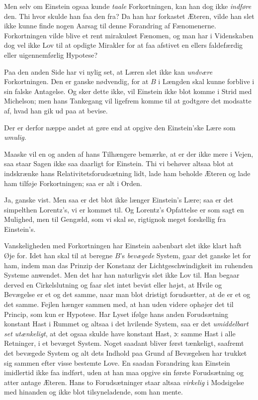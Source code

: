\documentclass[12pt,a4paper]{article}
\newcommand{\opage}[1]{\marginnote{\footnotesize\textit{[#1]}}}
\begin{document}
Men selv om Einstein ogsaa kunde \emph{taale} Forkortningen, kan han dog ikke
\emph{indføre} den. Thi hvor skulde han faa den fra? Da han har forkastet
Æteren, vilde han slet ikke kunne finde nogen Aarsag til denne Forandring af
Fænomenerne. Forkortningen vilde blive et rent mirakuløst Fænomen, og man har i
Videnskaben dog vel ikke Lov til at opdigte Mirakler for at faa afstivet en
ellers faldefærdig eller uigennemførlig Hypotese?

Paa den anden Side har vi nylig set, at Læren slet ikke kan \emph{undvære}
Forkortningen. Den er ganske nødvendig, for at $B$ i Længden skal kunne
forblive i sin falske Antagelse. Og sker dette ikke, vil Einstein ikke blot
komme i Strid med Michelson; men hans Tankegang vil ligefrem komme til at
godtgøre det modsatte af, hvad han gik ud paa at bevise.

\opage{202} Der er derfor næppe andet at gøre end at opgive den Einstein'ske Lære som
\emph{umulig}.

Maaske vil en og anden af hans Tilhængere bemærke, at er der ikke mere i
Vejen, saa staar Sagen ikke saa daarligt for Einstein. Thi vi behøver altsaa
blot at indskrænke hans Relativitetsforudsætning lidt, lade ham beholde Æteren
og lade ham tilføje Forkortningen; saa er alt i Orden.

Ja, ganske vist. Men saa er det blot ikke længer Einstein's Lære; saa er det
simpelthen Lorentz's, vi er kommet til. Og Lorentz's Opfattelse er som sagt en
Mulighed, men til Gengæld, som vi skal se, rigtignok meget forskellig fra
Einstein's.

Vanskeligheden med Forkortningen har Einstein aabenbart slet ikke klart haft
Øje for. Idet han skal til at beregne $B$'s \emph{bevægede} System, gaar det
ganske let for ham, \guillemotright indem man das Prinzip der Konstanz der
Lichtgeschwindigkeit im ruhenden Systeme anwendet.\guillemotleft{} Men det har
han naturligvis slet ikke Lov til. Han begaar derved en Cirkelslutning og faar
slet intet bevist eller højst, at Hvile og Bevægelse er et og det samme, naar
man blot dristigt forudsætter, at de er et og det samme. Fejlen hænger sammen
med, at han uden videre \guillemotright ophøjer\guillemotleft{} det til
Princip, som kun er Hypotese. Har Lyset ifølge hans anden Forudsætning konstant
Hast i Rummet og altsaa i det hvilende System, saa er det \emph{umiddelbart set
utænkeligt}, at det ogsaa skulde have konstant Hast, ɔ: samme Hast i alle
Retninger, i et bevæget System. Noget saadant bliver først tænkeligt, saafremt
det bevægede System og alt dets Indhold paa Grund af Bevægelsen har trukket sig
sammen efter visse bestemte Love. En saadan Forandring kan Einstein imidlertid
ikke faa indført, uden at han maa opgive sin første Forudsætning og atter
antage Æteren. Hans to Forudsætninger staar altsaa \emph{virkelig} i
Modsigelse med hinanden og ikke blot tilsyneladende, som han mente.
\end{document}
